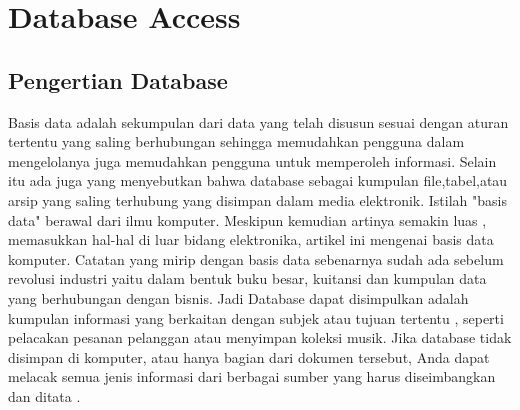 
\section {Database Access}

\subsection {Pengertian Database}
	Basis data adalah sekumpulan dari data yang telah disusun sesuai dengan aturan tertentu yang saling berhubungan sehingga memudahkan pengguna dalam mengelolanya juga memudahkan pengguna untuk memperoleh informasi. Selain itu ada juga yang menyebutkan bahwa database sebagai kumpulan ﬁle,tabel,atau arsip yang saling terhubung yang disimpan dalam media elektronik.
	Istilah "basis data" berawal dari ilmu komputer. Meskipun kemudian artinya semakin luas , memasukkan hal-hal di luar bidang elektronika, artikel ini mengenai basis data komputer. Catatan yang mirip dengan basis data sebenarnya sudah ada sebelum revolusi industri yaitu dalam bentuk buku besar, kuitansi dan kumpulan data yang berhubungan dengan bisnis.
	Jadi Database dapat disimpulkan adalah kumpulan informasi yang berkaitan dengan subjek atau tujuan tertentu , seperti pelacakan pesanan pelanggan atau menyimpan koleksi musik. Jika database tidak disimpan di komputer, atau hanya bagian dari dokumen tersebut, Anda dapat melacak semua jenis informasi dari berbagai sumber yang harus diseimbangkan dan ditata .

